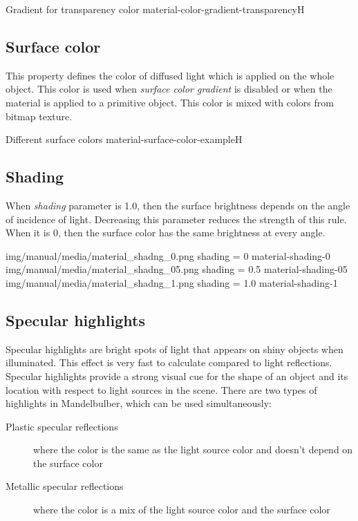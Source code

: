 {Gradient for transparency color}
{material-color-gradient-transparency}{H}

\subsection{Surface color}\label{materials-surface_color}

This property defines the color of diffused light which is applied on the whole object. This color is used when \emph{surface color gradient} is disabled or when the material is applied to a primitive object.
This  color is mixed with colors from bitmap texture.

{Different surface colors}
{material-surface-color-example}{H}

\subsection{Shading}\label{materials-shading}

When \emph{shading} parameter is 1.0, then the surface brightness depends on the angle of incidence of light. Decreasing this parameter reduces the strength of this rule. When it is 0, then the surface color has the same brightness at every angle. 

\threeImagesWithTwoCaptionsFullWidth
{img/manual/media/material_shadng_0.png}
{shading = 0}
{material-shading-0}
{img/manual/media/material_shadng_05.png}
{shading = 0.5}
{material-shading-05}
{img/manual/media/material_shadng_1.png}
{shading = 1.0}
{material-shading-1}

\subsection{Specular highlights}\label{materials-specular}

Specular highlights are bright spots of light that appears on shiny objects when illuminated. This effect is very fast to calculate compared to light reflections. Specular highlights provide a strong visual cue for the shape of an object and its location with respect to light sources in the scene.
There are two types of highlights in Mandelbulber, which can be used simultaneously:
\begin{description}
	\item[Plastic specular reflections] where the color is the same as the light source color and doesn't depend on the surface color
	\item[Metallic specular reflections] where the color is a mix of the light source color and the surface color
\end{description}

